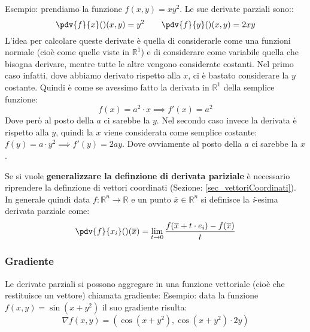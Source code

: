 Esempio: prendiamo la funzione $f(x, y) = xy^2$. Le sue derivate parziali sono::
\begin{equation*}
	\pdv{f}{x}() (x, y) = y^2 \qquad \pdv{f}{y}() (x, y) = 2xy
\end{equation*}
L'idea per calcolare queste derivate è quella di considerarle come una funzioni normale (cioè come quelle viste in $\mathbb{R}^1$) e di considerare come variabile quella che bisogna derivare, mentre tutte le altre vengono considerate costanti. Nel primo caso infatti, dove abbiamo derivato rispetto alla $x$, ci è bastato considerare la $y$ costante. Quindi è come se avessimo fatto la derivata in $\mathbb{R}^1$ della semplice funzione:
\begin{equation*}
	f(x) = a^2 \cdot x \implies f'(x) = a^2
\end{equation*}
Dove però al posto della $a$ ci sarebbe la $y$. Nel secondo caso invece la derivata è rispetto alla $y$, quindi la $x$ viene considerata come semplice costante: $f(y) = a \cdot y^2 \implies f'(y) = 2ay$. Dove ovviamente al posto della $a$ ci sarebbe la $x$.\bigbreak

Se si vuole \textbf{generalizzare la definzione di derivata pariziale} è necessario riprendere la definzione di vettori coordinati (Sezione: \ref{sec_vettoriCoordinati}). In generale quindi data $f: \mathbb{R}^n \to \mathbb{R}$ e un punto $\overline{x} \in \mathbb{R}^n$ si definisce la \textit{i}-esima derivata parziale come:
\begin{equation*}
	\pdv{f}{x_i}()(\overline{x}) = \lim_{t \to 0} \dfrac{f(\overline{x} + t \cdot e_i) - f(\overline{x})}{t}
\end{equation*}

\subsubsection{Gradiente}
Le derivate parziali si possono aggregare in una funzione vettoriale (cioè che restituisce un vettore) chiamata gradiente:
Esempio: data la funzione $f(x, y) = \sin(x + y^2)$ il suo gradiente risulta:
\begin{equation*}
	\nabla f (x, y) = (\cos(x + y^2), \cos(x + y^2) \cdot 2y)
\end{equation*}

